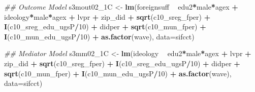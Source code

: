 \documentclass[
]{article}
\newenvironment{Shaded}{\begin{snugshade}}{\end{snugshade}}
\newcommand{\CommentTok}[1]{\textcolor[rgb]{0.56,0.35,0.01}{\textit{#1}}}
\newcommand{\DataTypeTok}[1]{\textcolor[rgb]{0.13,0.29,0.53}{#1}}
\newcommand{\DecValTok}[1]{\textcolor[rgb]{0.00,0.00,0.81}{#1}}
\newcommand{\KeywordTok}[1]{\textcolor[rgb]{0.13,0.29,0.53}{\textbf{#1}}}
\newcommand{\NormalTok}[1]{#1}
\newcommand{\OperatorTok}[1]{\textcolor[rgb]{0.81,0.36,0.00}{\textbf{#1}}}
\newcommand{\StringTok}[1]{\textcolor[rgb]{0.31,0.60,0.02}{#1}}
\begin{document}
\begin{Shaded}
\begin{Highlighting}[]
\CommentTok{## Outcome Model }
\NormalTok{s3mout02_1C <-}\StringTok{ }\KeywordTok{lm}\NormalTok{(foreignsuff  }\OperatorTok{~}\StringTok{ }\NormalTok{edu2}\OperatorTok{*}\NormalTok{male}\OperatorTok{*}\NormalTok{agex }\OperatorTok{+}\StringTok{ }\NormalTok{ideology}\OperatorTok{*}\NormalTok{male}\OperatorTok{*}\NormalTok{agex }\OperatorTok{+}\StringTok{ }\NormalTok{lvpr }\OperatorTok{+}\StringTok{  }
\StringTok{                    }\NormalTok{zip_did }\OperatorTok{+}\StringTok{ }\KeywordTok{sqrt}\NormalTok{(c10_sreg_fper) }\OperatorTok{+}\StringTok{ }\KeywordTok{I}\NormalTok{(c10_sreg_edu_ugsP}\OperatorTok{/}\DecValTok{10}\NormalTok{) }\OperatorTok{+}\StringTok{ }
\StringTok{                    }\NormalTok{didper }\OperatorTok{+}\StringTok{ }\KeywordTok{sqrt}\NormalTok{(c10_mun_fper) }\OperatorTok{+}\StringTok{ }\KeywordTok{I}\NormalTok{(c10_mun_edu_ugsP}\OperatorTok{/}\DecValTok{10}\NormalTok{) }\OperatorTok{+}\StringTok{ }
\StringTok{                    }\KeywordTok{as.factor}\NormalTok{(wave), }\DataTypeTok{data=}\NormalTok{sifcct)}

\CommentTok{## Mediator Model}
\NormalTok{s3mm02_1C <-}\StringTok{ }\KeywordTok{lm}\NormalTok{(ideology  }\OperatorTok{~}\StringTok{ }\NormalTok{edu2}\OperatorTok{*}\NormalTok{male}\OperatorTok{*}\NormalTok{agex }\OperatorTok{+}\StringTok{ }\NormalTok{lvpr }\OperatorTok{+}\StringTok{  }
\StringTok{                  }\NormalTok{zip_did }\OperatorTok{+}\StringTok{ }\KeywordTok{sqrt}\NormalTok{(c10_sreg_fper) }\OperatorTok{+}\StringTok{ }\KeywordTok{I}\NormalTok{(c10_sreg_edu_ugsP}\OperatorTok{/}\DecValTok{10}\NormalTok{) }\OperatorTok{+}\StringTok{ }
\StringTok{                  }\NormalTok{didper }\OperatorTok{+}\StringTok{ }\KeywordTok{sqrt}\NormalTok{(c10_mun_fper) }\OperatorTok{+}\StringTok{ }\KeywordTok{I}\NormalTok{(c10_mun_edu_ugsP}\OperatorTok{/}\DecValTok{10}\NormalTok{) }\OperatorTok{+}\StringTok{ }
\StringTok{                  }\KeywordTok{as.factor}\NormalTok{(wave), }\DataTypeTok{data=}\NormalTok{sifcct)}


\end{Highlighting}
\end{Shaded}
\end{document}
